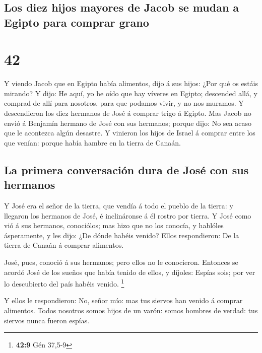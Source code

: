 \hypertarget{los-diez-hijos-mayores-de-jacob-se-mudan-a-egipto-para-comprar-grano}{%
\subsection{Los diez hijos mayores de Jacob se mudan a Egipto para
comprar
grano}\label{los-diez-hijos-mayores-de-jacob-se-mudan-a-egipto-para-comprar-grano}}

\hypertarget{section-41}{%
\section{42}\label{section-41}}

 Y viendo Jacob que en Egipto había alimentos, dijo á sus
hijos: ¿Por qué os estáis mirando?  Y dijo: He aquí, yo he
oído que hay víveres en Egipto; descended allá, y comprad de allí para
nosotros, para que podamos vivir, y no nos muramos.  Y
descendieron los diez hermanos de José á comprar trigo á Egipto.
 Mas Jacob no envió á Benjamín hermano de José con sus
hermanos; porque dijo: No sea acaso que le acontezca algún desastre.
 Y vinieron los hijos de Israel á comprar entre los que
venían: porque había hambre en la tierra de Canaán.

\hypertarget{la-primera-conversaciuxf3n-dura-de-josuxe9-con-sus-hermanos}{%
\subsection{La primera conversación dura de José con sus
hermanos}\label{la-primera-conversaciuxf3n-dura-de-josuxe9-con-sus-hermanos}}

 Y José era el señor de la tierra, que vendía á todo el
pueblo de la tierra: y llegaron los hermanos de José, é inclináronse á
él rostro por tierra.  Y José como vió á sus hermanos,
conociólos; mas hizo que no los conocía, y hablóles ásperamente, y les
dijo: ¿De dónde habéis venido? Ellos respondieron: De la tierra de
Canaán á comprar alimentos.

 José, pues, conoció á sus hermanos; pero ellos no le
conocieron.  Entonces se acordó José de los sueños que había
tenido de ellos, y díjoles: Espías sois; por ver lo descubierto del país
habéis venido. \footnote{\textbf{42:9} Gén 37,5-9}

 Y ellos le respondieron: No, señor mío: mas tus siervos
han venido á comprar alimentos.  Todos nosotros somos hijos
de un varón: somos hombres de verdad: tus siervos nunca fueron espías.

